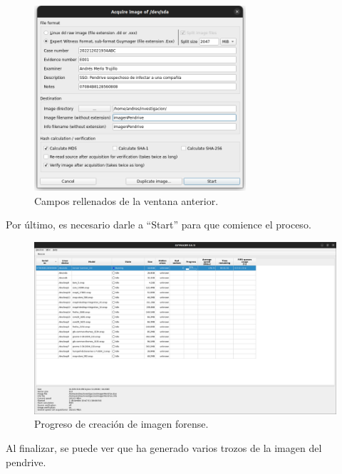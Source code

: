 \documentclass{article}
\begin{document}
\begin{figure}[H]
    \centering
    \includegraphics[width=0.7\textwidth]{imagenes/Captura desde 2022-12-02 19-36-04.png}
    \caption{Campos rellenados de la ventana anterior.}
\end{figure}

Por último, es necesario darle a ``Start'' para que comience el proceso.

\begin{figure}[H]
    \centering
    \includegraphics[width=\textwidth]{imagenes/Captura desde 2022-12-02 19-48-29.png}
    \caption{Progreso de creación de imagen forense.}
\end{figure}

\newpage

Al finalizar, se puede ver que ha generado varios trozos de la imagen del pendrive.
\end{document}
